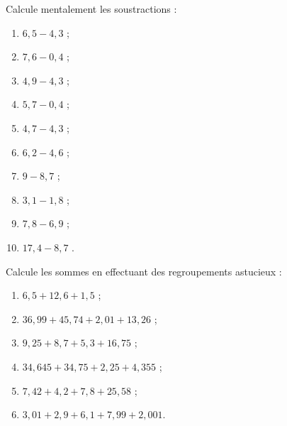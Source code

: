 \begin{exercice}
Calcule mentalement les soustractions :
\begin{enumerate} 
 \item $6,5 - 4,3$ \dotfill ; \hspace*{12em}
 
 \item $7,6 - 0,4$ \dotfill ; \hspace*{12em}
 
 \item $4,9 - 4,3$ \dotfill ; \hspace*{12em}
 
 \item $5,7 - 0,4$ \dotfill ; \hspace*{12em}
 
 \item $4,7 - 4,3$ \dotfill ; \hspace*{12em}
 
 \item $6,2 - 4,6$ \dotfill ; \hspace*{12em}
 
 \item $9 - 8,7$ \dotfill ; \hspace*{12em}
 
 \item $3,1 - 1,8$ \dotfill ; \hspace*{12em}
 
 \item $7,8 - 6,9$ \dotfill ; \hspace*{12em}
 
 \item \hspace{0.2em}$17,4 - 8,7$ \dotfill. \hspace*{12em}
 
 \end{enumerate}  
\end{exercice}


\begin{exercice}
Calcule les sommes en effectuant des regroupements astucieux :
\begin{enumerate} 
 \item $6,5 + 12,6 + 1,5$ ;
 \item $36,99 + 45,74 + 2,01 + 13,26$ ;
 \item $9,25 + 8,7 + 5,3 + 16,75$ ;
 \item $34,645 + 34,75 + 2,25 + 4,355$ ;
 \item $7,42 + 4,2 + 7,8 + 25,58$ ;
 \item $3,01 + 2,9 + 6,1 + 7,99 + 2,001$.
 \end{enumerate}
\end{exercice}


